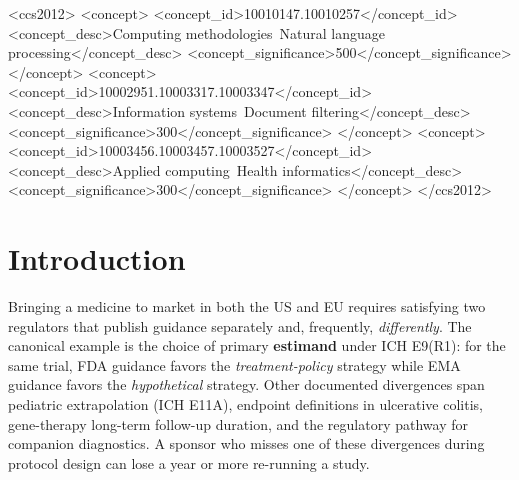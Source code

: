\documentclass[sigconf]{acmart}
\begin{document}
\begin{CCSXML}
<ccs2012>
  <concept>
    <concept_id>10010147.10010257</concept_id>
    <concept_desc>Computing methodologies~Natural language processing</concept_desc>
    <concept_significance>500</concept_significance>
  </concept>
  <concept>
    <concept_id>10002951.10003317.10003347</concept_id>
    <concept_desc>Information systems~Document filtering</concept_desc>
    <concept_significance>300</concept_significance>
  </concept>
  <concept>
    <concept_id>10003456.10003457.10003527</concept_id>
    <concept_desc>Applied computing~Health informatics</concept_desc>
    <concept_significance>300</concept_significance>
  </concept>
</ccs2012>
\end{CCSXML}



\maketitle

\section{Introduction}

Bringing a medicine to market in both the US and EU requires satisfying two
regulators that publish guidance separately and, frequently,
\textit{differently}. The canonical example is the choice of primary
\textbf{estimand} under ICH E9(R1): for the same trial, FDA guidance favors the
\textit{treatment-policy} strategy while EMA guidance favors the
\textit{hypothetical} strategy. Other documented divergences span pediatric
extrapolation (ICH E11A), endpoint definitions in ulcerative colitis, gene-therapy
long-term follow-up duration, and the regulatory pathway for companion
diagnostics. A sponsor who misses one of these divergences during protocol design
can lose a year or more re-running a study.
\end{document}
